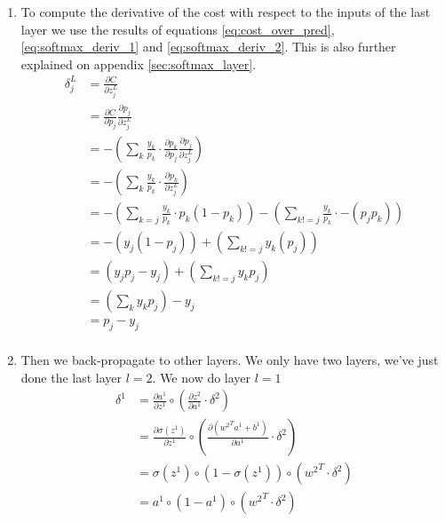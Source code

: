 			\begin{enumerate}
				\item To compute the derivative of the cost with respect to the inputs of the last layer we use the results of equations \ref{eq:cost_over_pred}, \ref{eq:softmax_deriv_1} and \ref{eq:softmax_deriv_2}. This is also further explained on appendix \ref{sec:softmax_layer}.
					\begin{equation}
						\begin{split}
							\delta^L_j
							&= \frac{\partial C}{\partial z^L_j } \\
							&= \frac{\partial C}{\partial p_j} \frac{\partial p_j}{\partial z^L_j } \\
							&= -\left(\sum_k \frac{y_k}{p_k} \cdot \frac{\partial p_k}{\partial p_j } \frac{\partial p_j}{\partial z^L_j } \right) \\
							&= -\left(\sum_k \frac{y_k}{p_k} \cdot \frac{\partial p_k}{\partial z^L_j } \right) \\
							&= -\left(\sum_{k=j} \frac{y_k}{p_k} \cdot p_k(1 - p_k) \right) - \left(\sum_{k!=j} \frac{y_k}{p_k} \cdot -(p_j p_k) \right) \\
							&= -\left(y_j  (1 - p_j) \right) + \left(\sum_{k!=j} y_k(p_j) \right) \\
							&=  \left(y_j p_j  - y_j\right)  + \left(\sum_{k!=j} y_k p_j  \right) \\
							&=  \left(\sum_{k} y_k p_j  \right) - y_j \\
							&=  p_j - y_j \\
						\end{split}
					\end{equation}
				\item Then we back-propagate to other layers. We only have two layers, we've just done the last layer $l=2$. We now do layer $l=1$
					\begin{equation}
						\begin{split}
							\delta^{1}
							&= \frac{\partial a^1 }{\partial z^1 } 		\circ
							\left( \frac{\partial z^2 }{\partial a^1 } \cdot \delta^2 \right) \\
							&= \frac{\partial \sigma(z^1)}{\partial z^1}\circ
							\left( \frac{\partial ({w^2}^T a^1+b^1 )}{\partial a^1} \cdot \delta^2 \right)\\
							&= \sigma(z^1)\circ(1-\sigma(z^1)) \circ ({w^2}^T \cdot \delta^2) \\
							&= a^1 \circ(1-a^1) \circ ({w^2}^T \cdot \delta^2) \\

\end{split}
\end{equation}
\end{enumerate}
